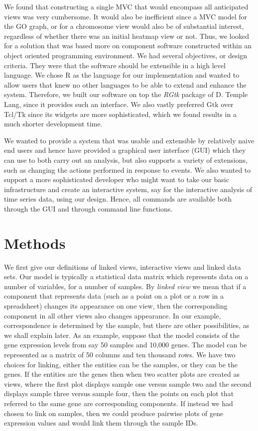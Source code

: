 \documentclass[11pt]{article}
\newcommand{\Rpackage}[1]{{\textit{#1}}}
\begin{document}
We found that constructing a single MVC that would encompass all
anticipated views was very cumbersome. It would also be inefficient
since a MVC model for the GO graph, or for a chromosome view would
also be of substantial interest, regardless of whether there was an
initial heatmap view or not. Thus, we looked for a solution that was
based more on component software constructed within an object oriented
programming environment.
We had several objectives, or design criteria. They were that the
software should be extensible in a high level language. We chose R as
the language for our implementation and wanted to allow users that
knew no other languages to be able to extend and enhance the
system. Therefore, we built our software on top the \Rpackage{RGtk} package of
D. Temple Lang, since it provides such an interface. We also vastly
preferred Gtk over Tcl/Tk since its widgets are more sophisticated,
which we found results in a much shorter development time.

We wanted to provide a system that was usable and extensible by
relatively naive end users and hence have provided a graphical user
interface (GUI) which they can use to both carry out an analysis, but
also supports a variety of extensions, such as changing the actions
performed in response to events. We also wanted to support a more
sophisticated developer who might want to take our basic infrastructure
and create an interactive system, say for the interactive analysis of
time series data, using our design. Hence, all commands are
available both through the GUI and through command line functions.

\section{Methods}

We first give our definitions of linked views, interactive views and
linked data sets.  Our model is typically a statistical data
matrix which represents data on a number of variables, for a
number of samples.  By \textit{linked view} we mean that if a
component that represents data (such as a point on a plot or a row in
a spreadsheet) changes its appearance on one view, then the
corresponding component in all other views also changes appearance.
In our example, correspondence is determined by the sample,
but there are other possibilities, as we shall explain later.  As an
example, suppose that the model consists of the gene expression levels
from say 50 samples and 10,000 genes.  The model can be represented as
a matrix of 50 columns and ten thousand rows.  We have two choices for
linking, either the entities can be the samples, or they can be the
genes. If the entities are the genes then when two scatter plots are
created as views, where the first plot displays sample one versus sample two 
and the second displays sample three versus sample four, then the points
on each plot that referred to the same gene are corresponding
components.  If instead we had chosen to link on samples, then we
could produce pairwise plots of gene expression values and would link
them through the sample IDs.
\end{document}
